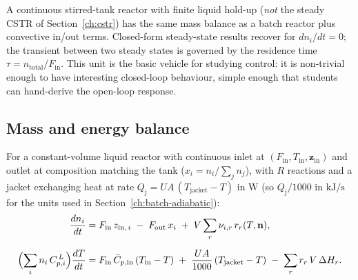 \documentclass[11pt,a4paper]{article}
\newcommand{\zv}{\mathbf{z}}
\newcommand{\nv}{\mathbf{n}}                          %
\begin{document}
\begin{whatyoulllearn}
A continuous stirred-tank reactor with finite liquid hold-up
(\emph{not} the steady CSTR of Section~\ref{ch:cstr}) has the same
mass balance as a batch reactor plus convective in/out terms.
Closed-form steady-state results recover for $dn_i/dt = 0$; the
transient between two steady states is governed by the residence
time $\tau = n_{\mathrm{total}} / F_{\mathrm{in}}$.  This unit is
the basic vehicle for studying control: it is non-trivial enough to
have interesting closed-loop behaviour, simple enough that students
can hand-derive the open-loop response.
\end{whatyoulllearn}

\subsection*{Mass and energy balance}

For a constant-volume liquid reactor with continuous inlet at
$(F_{\mathrm{in}}, T_{\mathrm{in}}, \zv_{\mathrm{in}})$ and outlet
at composition matching the tank ($x_i = n_i / \!\sum_j n_j$), with
$R$ reactions and a jacket exchanging heat at rate
$Q_{\mathrm{j}} = U A\,(T_{\mathrm{jacket}} - T)$ in $\mathrm{W}$
(so $Q_{\mathrm{j}} / 1000$ in $\mathrm{kJ/s}$ for the units used
in Section~\ref{ch:batch-adiabatic}):
\begin{align}
    \frac{d n_i}{dt}
    &= F_{\mathrm{in}}\, z_{\mathrm{in},\,i}
       \;-\; F_{\mathrm{out}}\, x_i
       \;+\; V \sum_{r} \nu_{i,r}\, r_r(T, \nv),
    \label{eq:dynCSTR-mass}\\[6pt]
    \Bigl(\sum_i n_i\, C_{p,i}^{\,L}\Bigr)\frac{dT}{dt}
    &= F_{\mathrm{in}}\,\bar{C}_{p,\mathrm{in}}\,(T_{\mathrm{in}} - T)
       \;+\; \frac{U A}{1000}\,(T_{\mathrm{jacket}} - T)
       \;-\; \sum_r r_r\, V\, \Delta H_r.
    \label{eq:dynCSTR-energy}
\end{align}
\end{document}

